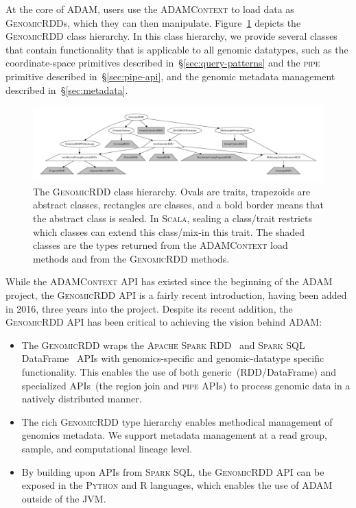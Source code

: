 \documentclass[phd]{ucbthesis}
\begin{document}
At the core of \textsc{ADAM}, users use the \textsc{ADAMContext} to load data as
\textsc{GenomicRDD}s, which they can then manipulate. Figure~\ref{fig:grdd}
depicts the \textsc{GenomicRDD} class hierarchy. In this class hierarchy, we
provide several classes that contain functionality that is applicable to all
genomic datatypes, such as the coordinate-space primitives described
in~\S\ref{sec:query-patterns} and the \textsc{pipe} primitive described
in~\S\ref{sec:pipe-api}, and the genomic metadata management described
in~\S\ref{sec:metadata}.

\begin{figure}[h]
\begin{center}
\includegraphics[width=0.95\linewidth]{graphs/grdd.pdf}
\end{center}
\caption{The \textsc{GenomicRDD} class hierarchy. Ovals are traits, trapezoids
  are abstract classes, rectangles are classes, and a bold border means that the
  abstract class is sealed. In \textsc{Scala}, sealing a class/trait restricts
  which classes can extend this class/mix-in this trait. The shaded classes are
  the types returned from the \textsc{ADAMContext} load methods and from the
  \textsc{GenomicRDD} methods.}
\label{fig:grdd}
\end{figure}

While the \textsc{ADAMContext} API has existed since the beginning of the
\textsc{ADAM} project, the \textsc{GenomicRDD} API is a fairly recent
introduction, having been added in 2016, three years into the project. Despite
its recent addition, the \textsc{GenomicRDD} API has been critical to achieving
the vision behind \textsc{ADAM}:

\begin{itemize}
\item The \textsc{GenomicRDD} wraps the \textsc{Apache Spark}
  RDD~\cite{zaharia12} and \textsc{Spark SQL} DataFrame~\cite{armbrust15} APIs
  with genomics-specific and genomic-datatype specific functionality. This
  enables the use of both generic~(RDD/DataFrame) and specialized APIs~(the
  region join and \textsc{pipe} APIs) to process genomic data in a natively
  distributed manner.
\item The rich \textsc{GenomicRDD} type hierarchy enables methodical management
  of genomics metadata. We support metadata management at a read group, sample,
  and computational lineage level.
\item By building upon APIs from \textsc{Spark SQL}, the \textsc{GenomicRDD} API
  can be exposed in the \textsc{Python} and R languages, which enables the use
  of \textsc{ADAM} outside of the JVM.
\end{itemize}
\end{document}
